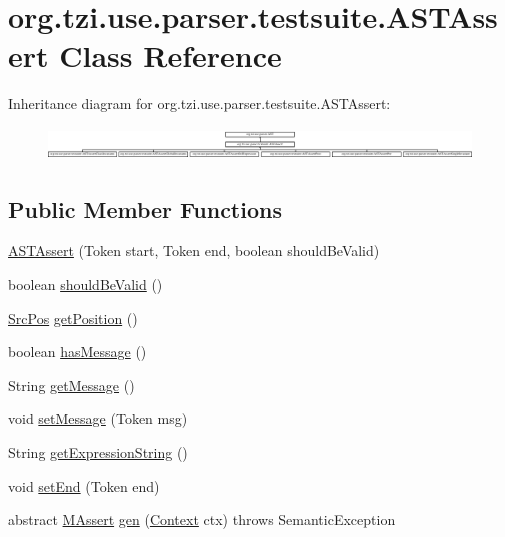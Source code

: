 \hypertarget{classorg_1_1tzi_1_1use_1_1parser_1_1testsuite_1_1_a_s_t_assert}{\section{org.\-tzi.\-use.\-parser.\-testsuite.\-A\-S\-T\-Assert Class Reference}
\label{classorg_1_1tzi_1_1use_1_1parser_1_1testsuite_1_1_a_s_t_assert}
}
Inheritance diagram for org.\-tzi.\-use.\-parser.\-testsuite.\-A\-S\-T\-Assert\-:\begin{figure}[H]
\begin{center}
\leavevmode
\includegraphics[height=0.864198cm]{classorg_1_1tzi_1_1use_1_1parser_1_1testsuite_1_1_a_s_t_assert}
\end{center}
\end{figure}
\subsection*{Public Member Functions}
\begin{DoxyCompactItemize}
\item 
\hyperlink{classorg_1_1tzi_1_1use_1_1parser_1_1testsuite_1_1_a_s_t_assert_aa50c2e5d13a8c14307a15a1c840ab835}{A\-S\-T\-Assert} (Token start, Token end, boolean should\-Be\-Valid)
\item 
boolean \hyperlink{classorg_1_1tzi_1_1use_1_1parser_1_1testsuite_1_1_a_s_t_assert_ad0bbc3d623ea38ccba143a0103a2d3b1}{should\-Be\-Valid} ()
\item 
\hyperlink{classorg_1_1tzi_1_1use_1_1parser_1_1_src_pos}{Src\-Pos} \hyperlink{classorg_1_1tzi_1_1use_1_1parser_1_1testsuite_1_1_a_s_t_assert_a6b8a30ed323ec8804c2e93949cdbf551}{get\-Position} ()
\item 
boolean \hyperlink{classorg_1_1tzi_1_1use_1_1parser_1_1testsuite_1_1_a_s_t_assert_ad7ffc26b74b6dc5febd51fa1b6c72c45}{has\-Message} ()
\item 
String \hyperlink{classorg_1_1tzi_1_1use_1_1parser_1_1testsuite_1_1_a_s_t_assert_a5a674f5aeb1192a084482763782fb2e0}{get\-Message} ()
\item 
void \hyperlink{classorg_1_1tzi_1_1use_1_1parser_1_1testsuite_1_1_a_s_t_assert_a21d3110bb8cb86d4ee650dab74db2b09}{set\-Message} (Token msg)
\item 
String \hyperlink{classorg_1_1tzi_1_1use_1_1parser_1_1testsuite_1_1_a_s_t_assert_ab5dfdcf79050b4a27499a8e55ea15efd}{get\-Expression\-String} ()
\item 
void \hyperlink{classorg_1_1tzi_1_1use_1_1parser_1_1testsuite_1_1_a_s_t_assert_a334d3f0b1f44564268f7df3e3295e7f7}{set\-End} (Token end)
\item 
abstract \hyperlink{classorg_1_1tzi_1_1use_1_1uml_1_1sys_1_1testsuite_1_1_m_assert}{M\-Assert} \hyperlink{classorg_1_1tzi_1_1use_1_1parser_1_1testsuite_1_1_a_s_t_assert_a467dbd070ad9e9b47dbcb24660897650}{gen} (\hyperlink{classorg_1_1tzi_1_1use_1_1parser_1_1_context}{Context} ctx)  throws Semantic\-Exception
\end{DoxyCompactItemize}


